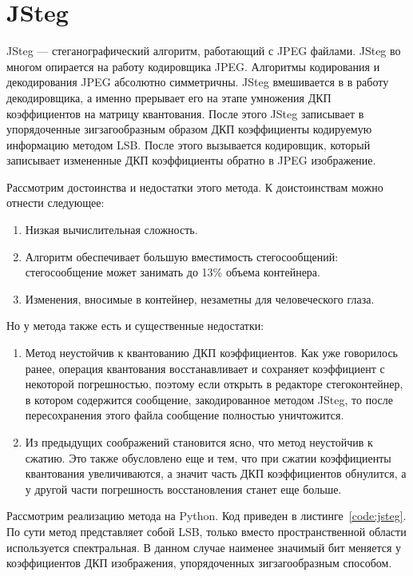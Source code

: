 \section{JSteg}
JSteg --- стеганографический алгоритм, работающий с JPEG файлами.
JSteg во многом опирается на работу кодировщика JPEG. Алгоритмы
кодирования и декодирования JPEG абсолютно симметричны.
JSteg вмешивается в в работу декодировщика, а именно прерывает
его на этапе умножения ДКП коэффициентов на матрицу квантования.
После этого JSteg записывает в упорядоченные зигзагообразным образом
ДКП коэффициенты кодируемую информацию методом LSB. После этого вызывается
кодировщик, который записывает измененные ДКП коэффициенты обратно в JPEG
изображение.

Рассмотрим достоинства и недостатки этого метода.
К доистоинствам можно отнести следующее:
\begin{enumerate}
    \item Низкая вычислительная сложность.
    \item Алгоритм обеспечивает большую вместимость стегосообщений:
    стегосообщение может занимать до 13\% объема контейнера.
    \item Изменения, вносимые в контейнер, незаметны для человеческого глаза.
\end{enumerate}
Но у метода также есть и существенные недостатки:
\begin{enumerate}
    \item Метод неустойчив к квантованию ДКП коэффициентов.
    Как уже говорилось ранее, операция квантования
    восстанавливает и сохраняет коэффициент с некоторой погрешностью,
    поэтому если открыть в редакторе стегоконтейнер, в котором
    содержится сообщение, закодированное методом JSteg,
    то после пересохранения этого файла сообщение полностью уничтожится. 
    \item Из предыдущих соображений становится ясно, что метод неустойчив
    к сжатию. Это также обусловлено еще и тем, что при сжатии коэффициенты
    квантования увеличиваются, а значит часть ДКП коэффициентов обнулится,
    а у другой части погрешность восстановления станет еще больше.
\end{enumerate}
Рассмотрим реализацию метода на Python. Код приведен в листинге~\ref{code:jsteg}.
По сути метод представляет собой LSB, только вместо пространственной области
используется спектральная. В данном случае наименее значимый бит меняется
у коэффициентов ДКП изображения, упорядоченных зигзагообразным способом. 


